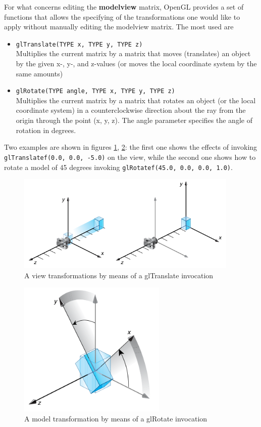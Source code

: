 %
For what concerns editing the \textbf{modelview} matrix, OpenGL 
provides a set of functions that allows the specifying of the 
transformations one would like to apply without manually 
editing the modelview matrix. The most used are 
%
\begin{itemize}
\item \texttt{glTranslate(TYPE x, TYPE y, TYPE z)}\\
  Multiplies the current matrix by a matrix that moves 
  (translates) an object by the given x-, y-, and z-values 
  (or moves the local coordinate system by the same amounts)

\item \texttt{glRotate(TYPE angle, TYPE x, TYPE y, TYPE z)} \\
  Multiplies the current matrix by a matrix that rotates an 
  object (or the   local coordinate system) in a counterclockwise 
  direction about the ray from the origin through the point 
  (x, y, z). The angle parameter specifies the angle of rotation in degrees.
\end{itemize}
Two examples are shown in figures \ref{fig:gltranslate}, \ref{fig:glrotate}:
the first one shows the effects of invoking \texttt{glTranslatef(0.0, 0.0, -5.0)} 
on the view, while the second one shows how to rotate a model of 45 degrees 
invoking \texttt{glRotatef(45.0, 0.0, 0.0, 1.0)}.
%
\begin{figure}[!h]
  \begin{center}
    \includegraphics[width=300pt]{img/gltranslate.png}
    \caption{A view transformations by means of a glTranslate invocation}
    \label{fig:gltranslate}
  \end{center}
\end{figure}
%
\begin{figure}[!h]
  \begin{center}
    \includegraphics[width=200pt]{img/glrotate.png}
    \caption{A model transformation by means of a glRotate invocation}
    \label{fig:glrotate}
  \end{center}
\end{figure}
%

